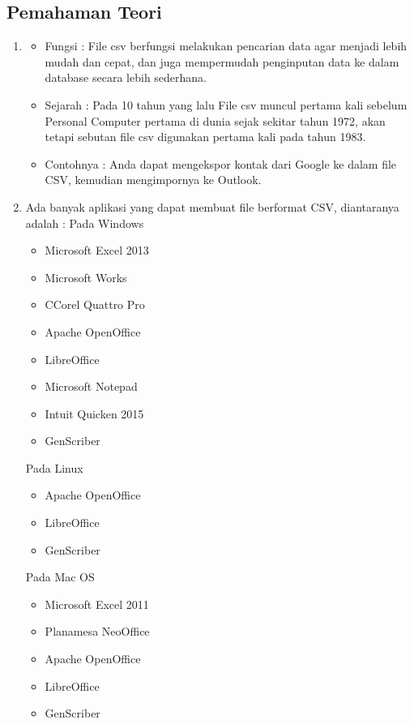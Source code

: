 	\subsection{Pemahaman Teori}
		\begin{enumerate}
			\item 
			\begin{itemize}
					\item Fungsi : File csv berfungsi melakukan pencarian data agar menjadi lebih mudah dan cepat, dan juga mempermudah penginputan 
					data ke dalam database secara lebih sederhana.
					\item Sejarah : Pada 10 tahun yang lalu File csv muncul pertama kali sebelum Personal Computer pertama  di dunia sejak 
					sekitar tahun 1972, akan tetapi sebutan file csv digunakan pertama kali pada tahun 1983.
					\item Contohnya : Anda dapat mengekspor kontak dari Google ke dalam file CSV, kemudian mengimpornya ke Outlook.
			\end{itemize}
			
			\item Ada banyak aplikasi yang dapat membuat file berformat CSV, diantaranya adalah :
				    Pada Windows
					\begin{itemize}
						\item Microsoft Excel 2013
						\item Microsoft Works
						\item CCorel Quattro Pro
						\item Apache OpenOffice
						\item LibreOffice
						\item Microsoft Notepad
						\item Intuit Quicken 2015
						\item GenScriber
					\end{itemize}
					Pada Linux
					\begin{itemize}
						\item Apache OpenOffice
						\item LibreOffice
						\item GenScriber
					\end{itemize}
					Pada Mac OS
					\begin{itemize}
						\item Microsoft Excel 2011
						\item Planamesa NeoOffice
						\item Apache OpenOffice
						\item LibreOffice
						\item GenScriber
					\end{itemize}
					

\end{enumerate}
